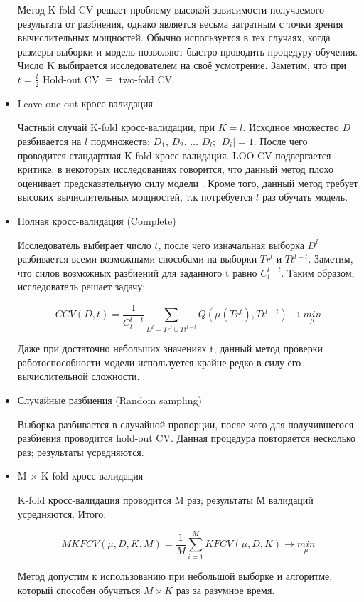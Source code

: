 \documentclass[a4paper, 14pt]{article}
\begin{document}
\begin{itemize}
	Метод K-fold CV решает проблему высокой зависимости получаемого результата от разбиения, однако является весьма затратным с точки зрения вычислительных мощностей. Обычно используется в тех случаях, когда размеры выборки и модель позволяют быстро проводить процедуру обучения. Число K выбирается исследователем на своё усмотрение. Заметим, что при $t = \frac{l}{2}$ Hold-out CV $ \equiv $ two-fold CV.
	
	\item Leave-one-out кросс-валидация
	
	Частный случай K-fold кросс-валидации, при $K=l$. Исходное множество $D$ разбивается на $l$ подмножеств: $D_1$, $D_2$, $\dots$ $D_l$; $\left|D_i\right| = 1$. После чего проводится стандартная K-fold кросс-валидация. LOO CV подвергается критике; в некоторых исследованиях говорится, что данный метод плохо оценивает предсказательную силу модели \cite{efron1986biased}. Кроме того, данный метод требует высоких вычислительных мощностей, т.к потребуется $l$ раз обучать модель.
	
	\item Полная кросс-валидация (Complete)
	
	Исследователь выбирает число $t$, после чего изначальная выборка $D^l$ разбивается всеми возможными способами на выборки $Tr^l$ и $Tt^{l-t}$. Заметим, что силов возможных разбиений для заданного t равно $C_l^{l-t}$. Таким образом, исследователь решает задачу:
	
	\[CCV(D, t) = \frac{1}{C_l^{l-t}} \sum_{D^l = Tr^l \cup Tt^{l-t}} Q(\mu (Tr^t), Tt^{l-t}) \rightarrow \underset{\mu}{min} \]
	
	Даже при достаточно небольших значениях t, данный метод проверки работоспособности модели используется крайне редко в силу его вычислительной сложности.
	
	\item Случайные разбиения (Random sampling)
	
	Выборка разбивается в случайной пропорции, после чего для получившегося разбиения проводится hold-out CV. Данная процедура повторяется несколько раз; результаты усредняются. 
	
	
	\item M $\times$ K-fold кросс-валидация
	
	K-fold кросс-валидация проводится M раз; результаты М валидаций усредняются. Итого: 
	
	\[MKFCV(\mu, D, K, M) = \frac{1}{M} \sum_{i=1}^{M} KFCV(\mu, D, K) \rightarrow \underset{\mu}{min}  \]
	
	Метод допустим к использованию при небольшой выборке и алгоритме, который способен обучаться $M \times K$ раз за разумное время.
\end{itemize}
\end{document}
